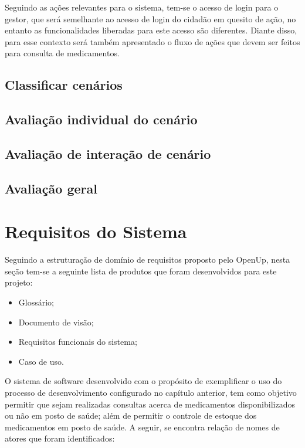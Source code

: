 %

Seguindo as ações relevantes para o sistema, tem-se o acesso de login para o gestor, que será semelhante ao acesso de login do cidadão em quesito de ação, no entanto as funcionalidades liberadas para este acesso são diferentes. Diante disso, para esse contexto será também apresentado o fluxo de ações que devem ser feitos para consulta de medicamentos.

\subsection{Classificar cenários}

\subsection{Avaliação individual do cenário}

\subsection{Avaliação de interação de cenário}

\subsection{Avaliação geral}


\section{Requisitos do Sistema}
\label{sec:visão do sistema}

Seguindo a estruturação de domínio de requisitos proposto pelo \acrfull{OpenUp}, nesta seção tem-se a seguinte lista de produtos que foram desenvolvidos para este projeto:
\begin{itemize}
    \item Glossário;
    \item Documento de visão;
    \item Requisitos funcionais do sistema;
    \item Caso de uso.
\end{itemize}

O sistema de software desenvolvido com o propósito de  exemplificar o uso do processo de desenvolvimento configurado no capítulo anterior, tem como objetivo permitir que sejam realizadas consultas acerca de medicamentos disponibilizados ou não em posto de saúde; além de permitir o controle de estoque dos medicamentos em posto de saúde. A seguir, se encontra relação de nomes de atores que foram identificados:

